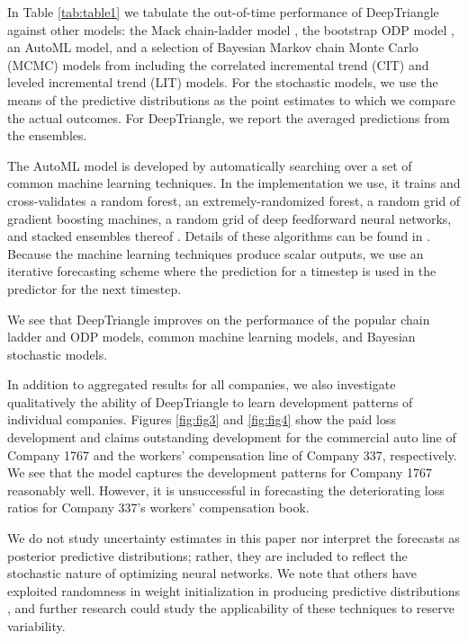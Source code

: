 \documentclass[risks,article,submit,moreauthors,pdftex]{mdpi}
\begin{document}
In Table \ref{tab:table1} we tabulate the out-of-time performance of DeepTriangle against other models: the Mack chain-ladder model \citep{mack1993distribution}, the bootstrap ODP model \citep{england2002stochastic}, an AutoML model, and a selection of Bayesian Markov chain Monte Carlo (MCMC) models from \citet{meyers2015stochastic} including the correlated incremental trend (CIT) and leveled incremental trend (LIT) models. For the stochastic models, we use the means of the predictive distributions as the point estimates to which we compare the actual outcomes. For DeepTriangle, we report the averaged predictions from the ensembles.

The AutoML model is developed by automatically searching over a set of common machine learning techniques. In the implementation we use, it trains and cross-validates a random forest, an extremely-randomized forest, a random grid of gradient boosting machines, a random grid of deep feedforward neural networks, and stacked ensembles thereof \citep{h2o_R_package}. Details of these algorithms can be found in \citet{friedman2001elements}. Because the machine learning techniques produce scalar outputs, we use an iterative forecasting scheme where the prediction for a timestep is used in the predictor for the next timestep.

We see that DeepTriangle improves on the performance of the popular chain ladder and ODP models, common machine learning models, and Bayesian stochastic models.

In addition to aggregated results for all companies, we also investigate qualitatively the ability of DeepTriangle to learn development patterns of individual companies. Figures \ref{fig:fig3} and \ref{fig:fig4} show the paid loss development and claims outstanding development for the commercial auto line of Company 1767 and the workers' compensation line of Company 337, respectively. We see that the model captures the development patterns for Company 1767 reasonably well. However, it is unsuccessful in forecasting the deteriorating loss ratios for Company 337's workers' compensation book.

We do not study uncertainty estimates in this paper nor interpret the forecasts as posterior predictive distributions; rather, they are included to reflect the stochastic nature of optimizing neural networks. We note that others have exploited randomness in weight initialization in producing predictive distributions \citep{NIPS2017_7219}, and further research could study the applicability of these techniques to reserve variability.
\end{document}
